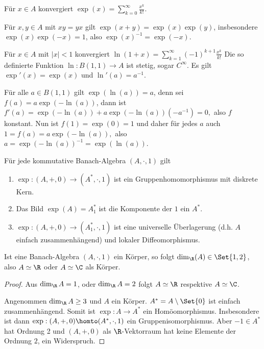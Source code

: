 Für $x \in A$ konvergiert $\exp(x) = \sum_{k=0}^\infty \frac{x^k}{k!}$.

Für $x,y \in A$ mit $xy = yx$ gilt $\exp(x + y) = \exp(x) \exp(y)$, insbesondere $\exp(x) \exp(-x) = 1$, also $\exp(x)^{-1} = \exp(-x)$.

Für $x \in A$ mit $|x| < 1$ konvergiert
\begin{math}
    \ln(1+x) = \sum_{k=1}^\infty (-1)^{k+1} \frac{x^k}{k!}
\end{math}
Die so definierte Funktion $\ln: B(1,1) \to A$ ist stetig, sogar $C^\infty$.
Es gilt $\exp'(x) = \exp(x)$ und $\ln'(a) = a^{-1}$.

Für alle $a \in B(1,1)$ gilt $\exp(\ln(a)) = a$, denn sei $f(a) = a \exp(-\ln(a))$, dann ist
\begin{math}
    f'(a) = \exp(-\ln(a)) + a \exp(-\ln(a))(-a^{-1})
    = 0,
\end{math}
also $f$ konstant.
Nun ist $f(1) = \exp(0) = 1$ und daher für jedes $a$ auch
\begin{math}
    1 = f(a) = a \exp(-\ln(a)),
\end{math}
also $a = \exp(-\ln(a))^{-1} = \exp(\ln(a))$.

\begin{st}
    Für jede kommutative Banach-Algebra $(A, \cdot, 1)$ gilt
    \begin{enumerate}[(1)]
        \item
            $\exp: (A, +, 0) \to (A^*, \cdot, 1)$ ist ein Gruppenhomomorphismus mit diskrete Kern.
        \item
            Das Bild $\exp(A) = A_1^*$ ist die Komponente der $1$ ein $A^*$.
        \item
            $\exp: (A, +, 0) \to (A_1^*, \cdot, 1)$ ist eine universelle Überlagerung (d.h. $A$ einfach zusammenhängend) und lokaler Diffeomorphismus.
    \end{enumerate}
\end{st}

\begin{st}
    Ist eine Banach-Algebra $(A, \cdot, 1)$ ein Körper, so folgt $\dim_\R(A) \in \Set{1,2}$, also $A \homeomorphic \R$ oder $A \homeomorphic \C$ als Körper.
    \begin{proof}
        Aus $\dim_\R A = 1$, oder $\dim_\R A = 2$ folgt $A \homeomorphic \R$ respektive $A \homeomorphic \C$.

        Angenommen $\dim_\R A \ge 3$ und $A$ ein Körper.
        $A^* = A \setminus \Set{0}$ ist einfach zusammenhängend.
        Somit ist $\exp: A \to A^*$ ein Homöomorphismus.
        Insbesondere ist dann $\exp: (A, +, 0) \homto (A^*, \cdot, 1)$ ein Gruppenisomorphismus.
        Aber $-1 \in A^*$ hat Ordnung 2 und $(A, +, 0)$ als $\R$-Vektorraum hat keine Elemente der Ordnung $2$, ein Widerspruch.
    \end{proof}
\end{st}

